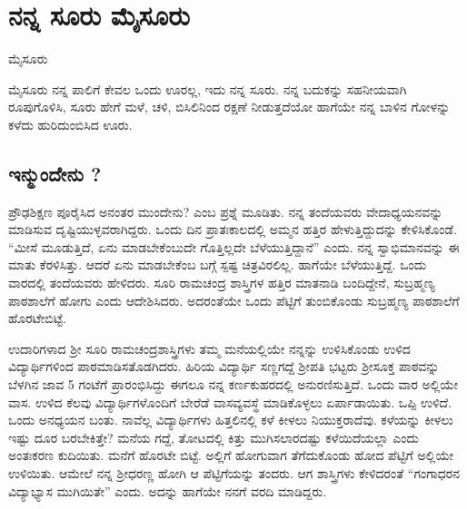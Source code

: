 
\chapter{ನನ್ನ ಸೂರು ಮೈಸೂರು}

\begin{center}
\smallskip
ಮೈಸೂರು
\addrule
\end{center}


ಮೈಸೂರು ನನ್ನ ಪಾಲಿಗೆ ಕೇವಲ ಒಂದು ಊರಲ್ಲ, ಇದು ನನ್ನ ಸೂರು.  ನನ್ನ ಬದುಕನ್ನು ಸಹನೀಯವಾಗಿ ರೂಪುಗೊಳಿಸಿ, ಸೂರು ಹೇಗೆ ಮಳೆ, ಚಳಿ, ಬಿಸಿಲಿನಿಂದ ರಕ್ಷಣೆ ನೀಡುತ್ತದೆಯೋ ಹಾಗೆಯೇ ನನ್ನ ಬಾಳಿನ ಗೋಳನ್ನು ಕಳೆದು ಹುರಿದುಂಬಿಸಿದ ಊರು.

\section*{ಇನ್ಮುಂದೇನು ?} 

ಪ್ರೌಢಶಿಕ್ಷಣ ಪೂರೈಸಿದ ಅನಂತರ ಮುಂದೇನು? ಎಂಬ ಪ್ರಶ್ನೆ ಮೂಡಿತು.  ನನ್ನ ತಂದೆಯವರು ವೇದಾಧ್ಯಯನವನ್ನು ಮಾಡಿಸುವ ದೃಷ್ಟಿಯುಳ್ಳವರಾಗಿದ್ದರು.  ಒಂದು ದಿನ ಪ್ರಾತಃಕಾಲದಲ್ಲಿ ಅಮ್ಮನ ಹತ್ತಿರ ಹೇಳುತ್ತಿದ್ದುದನ್ನು ಕೇಳಿಸಿಕೊಂಡೆ.  “ಮೀಸೆ ಮೂಡುತ್ತಿದೆ, ಏನು ಮಾಡಬೇಕೆಂಬುದೇ ಗೊತ್ತಿಲ್ಲದೇ ಬೆಳೆಯುತ್ತಿದ್ದಾನೆ” ಎಂದು.   ನನ್ನ ಸ್ವಾಭಿಮಾನವನ್ನು ಈ ಮಾತು ಕೆರಳಿಸಿತ್ತು.  ಆದರೆ ಏನು ಮಾಡಬೇಕೆಂಬ ಬಗ್ಗೆ ಸ್ಪಷ್ಟ ಚಿತ್ರವಿರಲಿಲ್ಲ.  ಹಾಗೆಯೇ ಬೆಳೆಯುತ್ತಿದ್ದೆ.  ಒಂದು ವಾರದಲ್ಲಿ ತಂದೆಯವರು ಹೇಳಿದರು.  ಸೂರಿ ರಾಮಚಂದ್ರ ಶಾಸ್ತ್ರಿಗಳ ಹತ್ತಿರ ಮಾತನಾಡಿ ಬಂದಿದ್ದೇನೆ, ಸುಬ್ರಹ್ಮಣ್ಯ ಪಾಠಶಾಲೆಗೆ ಹೋಗು ಎಂದು ಆದೇಶಿಸಿದರು. ಅದರಂತೆಯೇ ಒಂದು ಪೆಟ್ಟಿಗೆ ತುಂಬಿಕೊಂಡು ಸುಬ್ರಹ್ಮಣ್ಯ ಪಾಠಶಾಲೆಗೆ ಹೊರಟೇಬಿಟ್ಟೆ.  

ಉದಾರಿಗಳಾದ ಶ್ರೀ ಸೂರಿ ರಾಮಚಂದ್ರಶಾಸ್ತ್ರಿಗಳು ತಮ್ಮ ಮನೆಯಲ್ಲಿಯೇ ನನ್ನನ್ನು ಉಳಿಸಿಕೊಂಡು ಉಳಿದ ವಿದ್ಯಾರ್ಥಿಗಳಿಂದ ಪಾಠಮಾಡಿಸತೊಡಗಿದರು.  ಹಿರಿಯ ವಿದ್ಯಾರ್ಥಿ ಸಣ್ಣಗದ್ದೆ ಶ್ರೀಪತಿ ಭಟ್ಟರು ಶ್ರೀಸೂಕ್ತ ಪಾಠವನ್ನು ಬೆಳಗಿನ ಜಾವ 5 ಗಂಟೆಗೆ ಪ್ರಾರಂಭಿಸಿದ್ದು ಈಗಲೂ ನನ್ನ ಕರ್ಣಕುಹರದಲ್ಲಿ  ಅನುರಣಿಸುತ್ತಿದೆ.  ಒಂದು ವಾರ ಅಲ್ಲಿಯೇ ವಾಸ.  ಉಳಿದ ಕೆಲವು ವಿದ್ಯಾರ್ಥಿಗಳೊಂದಿಗೆ ಬೇರೆಡೆ ವಾಸವ್ಯವಸ್ಥೆ ಮಾಡಿಕೊಳ್ಳಲು ಏರ್ಪಾಡಾಯಿತು.  ಒಪ್ಪಿ ಉಳಿದೆ.  ಒಂದು ಅನಧ್ಯಯನ ಬಂತು.  ನಾವೆಲ್ಲ ವಿದ್ಯಾರ್ಥಿಗಳು ಹಿತ್ತಲಿನಲ್ಲಿ ಕಳೆ ಕೀಳಲು ನಿಯುಕ್ತರಾದೆವು.  ಕಳೆಯನ್ನು ಕೀಳಲು ಇಷ್ಟು ದೂರ ಬರಬೇಕಿತ್ತೇ? ಮನೆಯ ಗದ್ದೆ, ತೋಟದಲ್ಲಿ ಕಿತ್ತು ಮುಗಿಸಲಾರದಷ್ಟು ಕಳೆಯಿದೆಯಲ್ಲಾ ಎಂದು ಅಂತಃಕರಣ ಕುದಿಯಿತು.  ಮನೆಗೆ ಹೊರಟೇ ಬಿಟ್ಟೆ.  ಅಲ್ಲಿಗೆ ಹೋಗುವಾಗ ತೆಗೆದುಕೊಂಡು ಹೋದ ಪೆಟ್ಟಿಗೆ ಅಲ್ಲಿಯೇ ಉಳಿಯಿತು. ಆಮೇಲೆ ನನ್ನ ಶ್ರೀಧರಣ್ಣ ಹೋಗಿ ಆ ಪೆಟ್ಟಿಗೆಯನ್ನು ತಂದರು. ಆಗ ಶಾಸ್ತ್ರಿಗಳು ಕೇಳಿದರಂತೆ  “ಗಂಗಾಧರನ ವಿದ್ಯಾಭ್ಯಾಸ ಮುಗಿಯಿತೇ” ಎಂದು. ಅದನ್ನು ಹಾಗೆಯೇ ನನಗೆ ವರದಿ ಮಾಡಿದ್ದರು. 

